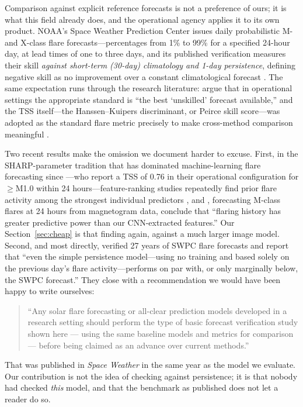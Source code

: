 \documentclass[11pt]{article}
\begin{document}
Comparison against explicit reference forecasts is not a preference of ours; it
is what this field already does, and the operational agency applies it to its own
product. NOAA's Space Weather Prediction Center issues daily probabilistic M- and
X-class flare forecasts---percentages from 1\% to 99\% for a specified 24-hour
day, at lead times of one to three days, and its published verification measures
their skill \emph{against short-term (30-day) climatology and 1-day persistence},
defining negative skill as no improvement over a constant climatological forecast
\citep{swpcverif}. The same expectation runs through the research literature:
\citet{leka2019b} argue that in operational settings the appropriate standard is
``the best `unskilled' forecast available,'' and the TSS itself---the
Hanssen--Kuipers discriminant, or Peirce skill score---was adopted as the standard
flare metric precisely to make cross-method comparison meaningful
\citep{bloomfield2012}.

Two recent results make the omission we document harder to excuse. First, in the
SHARP-parameter tradition \citep{bobra2014} that has dominated machine-learning
flare forecasting since \citet{bobra2015}---who report a TSS of 0.76 in their
operational configuration for $\geq$M1.0 within 24 hours---feature-ranking studies
repeatedly find prior flare activity among the strongest individual predictors
\citep{nishizuka2017,campi2019}, and \citet{vandersande2023}, forecasting M-class
flares at 24 hours from magnetogram data, conclude that ``flaring history has
greater predictive power than our CNN-extracted features.'' Our
Section~\ref{sec:cheap} is that finding again, against a much larger image model.
Second, and most directly, \citet{camporeale2025} verified 27 years of SWPC flare
forecasts and report that ``even the simple persistence model---using no training
and based solely on the previous day's flare activity---performs on par with, or
only marginally below, the SWPC forecast.'' They close with a recommendation we
would have been happy to write ourselves:

\begin{quote}
``Any solar flare forecasting or all-clear prediction models developed in a
research setting should perform the type of basic forecast verification study
shown here --- using the same baseline models and metrics for comparison ---
before being claimed as an advance over current methods.''
\end{quote}

That was published in \emph{Space Weather} in the same year as the model we
evaluate. Our contribution is not the idea of checking against persistence; it is
that nobody had checked \emph{this} model, and that the benchmark as published
does not let a reader do so.
\end{document}
